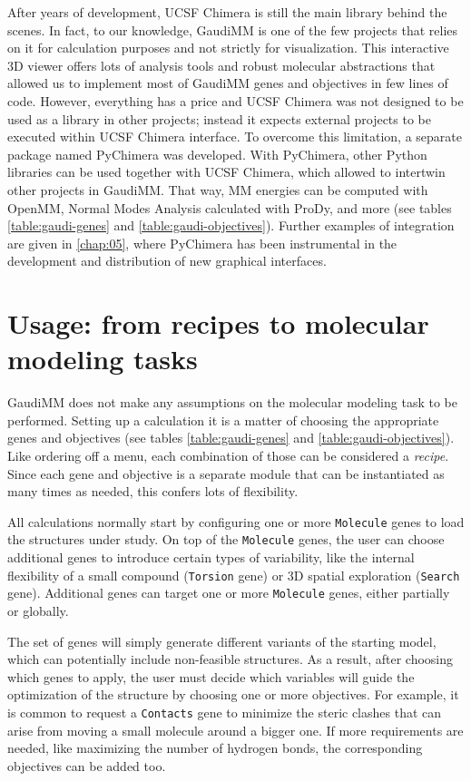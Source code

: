 After years of development, UCSF Chimera is still the main library behind the scenes. In fact, to our knowledge, GaudiMM is one of the few projects that relies on it for calculation purposes and not strictly for visualization. This interactive 3D viewer offers lots of analysis tools and robust molecular abstractions that allowed us to implement most of GaudiMM genes and objectives in few lines of code. However, everything has a price and UCSF Chimera was not designed to be used as a library in other projects; instead it expects external projects to be executed within UCSF Chimera interface. To overcome this limitation, a separate package named PyChimera was developed. With PyChimera, other Python libraries can be used together with UCSF Chimera, which allowed to intertwin other projects in GaudiMM. That way, MM energies can be computed with OpenMM, Normal Modes Analysis calculated with ProDy, and more (see tables \ref{table:gaudi-genes} and \ref{table:gaudi-objectives}). Further examples of integration are given in \autoref{chap:05}, where PyChimera has been instrumental in the development and distribution of new graphical interfaces.

\section{Usage: from recipes to molecular modeling tasks}

GaudiMM does not make any assumptions on the molecular modeling task to be performed. Setting up a calculation it is a matter of choosing the appropriate genes and objectives (see tables \ref{table:gaudi-genes} and \ref{table:gaudi-objectives}). Like ordering off a menu, each combination of those can be considered a \textit{recipe}. Since each gene and objective is a separate module that can be instantiated as many times as needed, this confers lots of flexibility.

All calculations normally start by configuring one or more \texttt{Molecule} genes to load the structures under study. On top of the \texttt{Molecule} genes, the user can choose additional genes to introduce certain types of variability, like the internal flexibility of a small compound (\texttt{Torsion} gene) or 3D spatial exploration (\texttt{Search} gene). Additional genes can target one or more \texttt{Molecule} genes, either partially or globally.

The set of genes will simply generate different variants of the starting model, which can potentially include non-feasible structures. As a result, after choosing which genes to apply, the user must decide which variables will guide the optimization of the structure by choosing one or more objectives. For example, it is common to request a \texttt{Contacts} gene to minimize the steric clashes that can arise from moving a small molecule around a bigger one.  If more requirements are needed, like maximizing the number of hydrogen bonds, the corresponding objectives can be added too.

